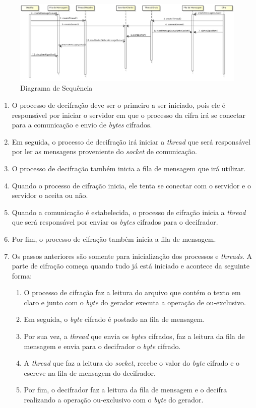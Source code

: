 \begin{figure}[h]
	\centering
	\includegraphics[scale=0.5, angle = 90]{figuras/sequenceDiagram.eps}
	\caption{Diagrama de Sequência}
	\label{sequence-diagram}
\end{figure}


\begin{enumerate}
	\item O processo de decifração deve ser o primeiro a ser iniciado, pois ele é responsável por iniciar o servidor em que o processo da cifra irá se conectar para a comunicação e envio de \textit{bytes} cifrados.
	\item Em seguida, o processo de decifração irá iniciar a \textit{thread} que será responsável por ler as mensagens proveniente do \textit{socket} de comunicação.
	\item O processo de decifração também inicia a fila de mensagem que irá utilizar.
	\item Quando o processo de cifração inicia, ele tenta se conectar com o servidor e o servidor o aceita ou não.
	\item Quando a comunicação é estabelecida, o processo de cifração inicia a \textit{thread} que será responsável por enviar os \textit{bytes} cifrados para o decifrador.
	\item Por fim, o processo de cifração também inicia a fila de mensagem.
	\item Os passos anteriores são somente para inicialização dos processos e \textit{threads}. A parte de cifração começa quando tudo já está iniciado e acontece da seguinte forma:
		\begin{enumerate}
			\item O processo de cifração faz a leitura do arquivo que contém o texto em claro e junto com o \textit{byte} do gerador executa a operação de ou-exclusivo.
			\item Em seguida, o \textit{byte} cifrado é postado na fila de mensagem.
			\item Por sua vez, a \textit{thread} que envia os \textit{bytes} cifrados, faz a leitura da fila de mensagem e envia para o decifrador o \textit{byte} cifrado.
			\item A \textit{thread} que faz a leitura do \textit{socket}, recebe o valor do \textit{byte} cifrado e o escreve na fila de mensagem do decifrador.
			\item Por fim, o decifrador faz a leitura da fila de mensagem e o decifra realizando a operação ou-exclusivo com o \textit{byte} do gerador.
		\end{enumerate}

\end{enumerate}
